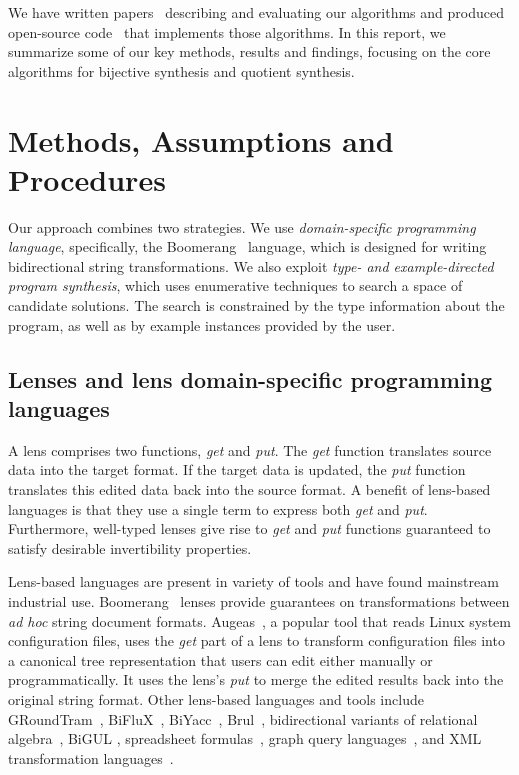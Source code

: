 \documentclass[12pt]{article}
\begin{document}
{We have written
papers~\cite{bijective-synthesis,quotient-synthesis,symmetric-synthesis}
describing and evaluating our algorithms and produced open-source 
code~\cite{GitHub} that implements those algorithms.  In this report,
we summarize some of our key methods, results and findings, focusing
on the core algorithms for bijective synthesis and quotient synthesis.

\section{Methods, Assumptions and Procedures}

Our approach combines two strategies.  We use \textit{domain-specific programming
  language}, specifically, the Boomerang~\cite{boomerang, Matching10} language,
which is designed for writing bidirectional string transformations.  We also exploit
\textit{type- and example-directed program synthesis}, which uses enumerative
techniques to search a space of candidate solutions.  The search is constrained
by the type information about the program, as well as by example instances
provided by the user.

\subsection{Lenses and lens domain-specific programming languages}

A lens comprises two functions,
\emph{get} and \emph{put}.  The \emph{get} function translates
source data into the target format.  If the target data is updated, the
\emph{put} function translates this edited data back into the
source format.  
A benefit of lens-based languages is that they use a single term
to express both 
\emph{get} and \emph{put}.
Furthermore, well-typed lenses give rise to 
\emph{get} and \emph{put} functions 
guaranteed to satisfy desirable invertibility properties.

Lens-based languages are present in variety of tools and have found mainstream
industrial use.
Boomerang~\cite{boomerang, Matching10} lenses provide
guarantees on transformations between {\em ad hoc} string document formats.
Augeas~\cite{augeas}, a popular tool that reads Linux system configuration
files, uses the \emph{get} part of a lens to transform configuration
files into a canonical tree representation that users can edit
either manually or 
programmatically.  It uses the lens's \emph{put} to merge the edited
results back into the original string format.  Other lens-based languages and
tools include 
%
GRoundTram~\cite{Hidaka2011GRoundTramAI},
%
BiFluX~\cite{DBLP:conf/ppdp/PachecoZH14}, 
%
BiYacc~\cite{DBLP:conf/staf/ZhuK0SH15},
%
Brul~\cite{DBLP:conf/etaps/ZanLKH16},
%
bidirectional variants of 
relational algebra~\cite{BohannonPierceVaughan},
%
BiGUL \cite{DBLP:conf/pepm/KoZH16}, 
%
spreadsheet formulas~\cite{DBLP:conf/vl/MacedoPSC14},
graph query languages~\cite{DBLP:conf/icfp/HidakaHIKMN10},
and
XML transformation languages~\cite{DBLP:conf/pepm/LiuHT07}.


}
\end{document}
